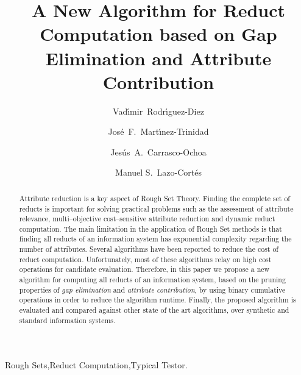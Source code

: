 \documentclass[number,preprint,review,12pt]{elsarticle}
\begin{document}
	\title{A New Algorithm for Reduct Computation based on Gap Elimination and Attribute Contribution}
	
	\author[inaoe,uc]{Vad\'{\i}mir~Rodr\'{\i}guez-Diez}
	\author[inaoe]{Jos\'{e}~F.~Mart\'{\i}nez-Trinidad}
	\author[inaoe]{Jes\'{u}s~A.~Carrasco-Ochoa}	
	\author[inaoe]{Manuel S.~Lazo-Cort\'{e}s}
	\address[inaoe]{Computer Science Department\\
					Instituto Nacional de Astrof\'{\i}sica, \'{O}ptica y Electr\'{o}nica\\
					Luis Enrique Erro \# 1, Santa Mar\'{\i}a Tonantzintla, Puebla, 72840, M\'{e}xico} 
	\address[uc]{Electrical Engineering Department\\
				 Universidad de Camag\"{u}ey\\
				 Circv. Nte. km 5$\frac{1}{2}$, Camag\"{u}ey, Cuba}
	
	\begin{abstract}
		Attribute reduction is a key aspect of Rough Set Theory.  Finding the complete set of reducts is important for solving practical problems such as the assessment of attribute relevance, multi--objective 		cost--sensitive attribute reduction and dynamic reduct computation. The main limitation in the application of Rough Set methods is that finding all reducts of an information system has exponential complexity regarding the number of attributes. Several algorithms have been reported to reduce the cost of reduct computation. Unfortunately, most of these algorithms relay on high cost operations for candidate evaluation. Therefore, in this paper we propose a new algorithm for computing all reducts of an information system, based on the pruning properties of \textit{gap  elimination} and \textit{attribute contribution}, by using binary cumulative operations in order to reduce the algorithm runtime. Finally, the proposed algorithm is evaluated and compared against other state of the art algorithms, over synthetic and standard information systems.
	\end{abstract}
	
	\begin{keyword}
		Rough Sets\sep Reduct Computation\sep Typical Testor.
	\end{keyword}

	\maketitle

\end{document}
